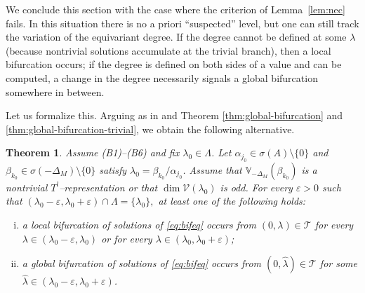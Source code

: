 \documentclass[reqno,twoside,12pt]{amsart}
\newtheorem{Theorem}[Remark]{Theorem}
\newcommand{\bV}{\mathbb{V}}
\newcommand{\cT}{\mathcal{T}}
\newcommand{\cV}{\mathcal{V}}
\numberwithin{equation}{section} \errorcontextlines=0
\begin{document}
We conclude this section with the case where the criterion of Lemma~\ref{lem:nec} fails. In this situation there is no a priori “suspected” level, but one can still track the variation of the equivariant degree. If the degree cannot be defined at some $\lambda$ (because nontrivial solutions accumulate at the trivial branch), then a local bifurcation occurs; if the degree is defined on both sides of a value and can be computed, a change in the degree necessarily signals a global bifurcation somewhere in between.

Let us formalize this. Arguing as in \cite[Theorem.~3.8]{GolKluSte2} and Theorem \ref{thm:global-bifurcation} and \ref{thm:global-bifurcation-trivial}, we obtain the following alternative.

\begin{Theorem}\label{thm:local-or-global}
Assume \textnormal{(B1)}--\textnormal{(B6)} and fix $\lambda_0\in\Lambda$.
Let $\alpha_{j_0}\in\sigma(A)\setminus\{0\}$ and $\beta_{k_0}\in\sigma(-\Delta_M)\setminus\{0\}$ satisfy $\lambda_0=\beta_{k_0}/\alpha_{j_0}$.
Assume that $\bV_{-\Delta_M}(\beta_{k_0})$ is a nontrivial $T^{l}$--rep\-re\-sen\-ta\-tion or that $\dim\cV(\lambda_0)$ is odd.
For every $\varepsilon>0$ such that
$(\lambda_0-\varepsilon,\lambda_0+\varepsilon)\cap
\Lambda
=\{\lambda_0\},$
at least one of the following holds:
\begin{enumerate}[(i)]
\item a local bifurcation of solutions of \eqref{eq:bifeq} occurs from $(0,\lambda)\in\cT$ for every $\lambda\in(\lambda_0-\varepsilon,\lambda_0)$ or for every $\lambda\in(\lambda_0,\lambda_0+\varepsilon)$;
\item a global bifurcation of solutions of \eqref{eq:bifeq} occurs from $(0,\widehat\lambda)\in\cT$ for some $\widehat\lambda\in(\lambda_0-\varepsilon,\lambda_0+\varepsilon)$.
\end{enumerate}
\end{Theorem}
\end{document}
